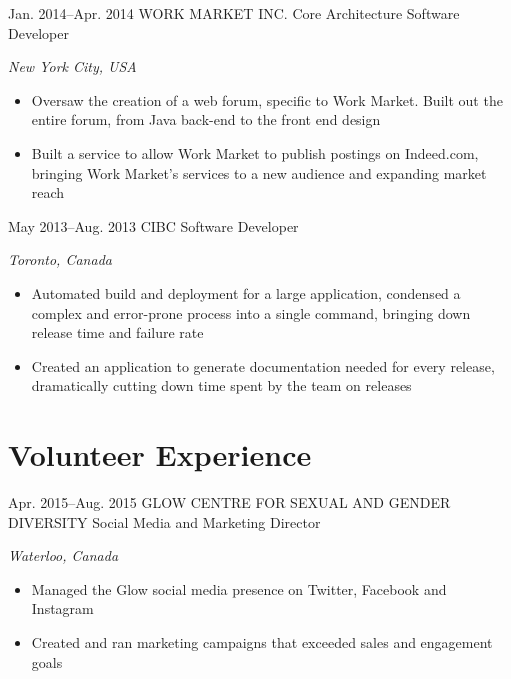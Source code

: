 \documentclass{resume-class}
\begin{document}
\begin{sectionlist}
	\entry
	{Jan. 2014--Apr. 2014}
	{WORK MARKET INC.}
	{Core Architecture Software Developer }
	{\emph {New York City, USA}\\
		\begin{itemize}
		    \setlength{\itemsep}{0.2em}
			\item Oversaw the creation of a web forum, specific to Work Market. Built out the entire forum,  from Java back-end to the front end design
			\item Built a service to allow Work Market to publish postings on Indeed.com, bringing Work Market's services to a new audience and expanding market reach
		\end{itemize}
	}
	
	\entry
	{May 2013--Aug. 2013}
	{CIBC}
	{Software Developer}
	{\emph {Toronto, Canada} \\
		\begin{itemize}
		    \setlength{\itemsep}{0.2em}
			\item Automated build and deployment for a large application, condensed a complex and error-prone process into a single command, bringing down release time and failure rate
			\item Created an application to generate documentation needed for every release,\\dramatically cutting down time spent by the team on releases
		\end{itemize}
	}
	
\end{sectionlist}



\vspace{-2.5\parskip}
\section{Volunteer Experience}


\begin{sectionlist}
	
	\entry
	{Apr. 2015--Aug. 2015}
	{GLOW CENTRE FOR SEXUAL AND GENDER DIVERSITY}
	{Social Media and Marketing Director}
	{\emph{Waterloo, Canada} \\
		\begin{itemize}
		    \setlength{\itemsep}{0.2em}
			\item Managed the Glow social media presence on Twitter, Facebook and Instagram
			\item Created and ran marketing campaigns that exceeded sales and engagement goals  
		\end{itemize}
	}

\end{sectionlist}
\end{document}
